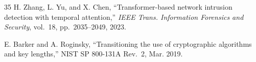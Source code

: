 \documentclass[conference]{IEEEtran}
\begin{document}
\begin{thebibliography}{35}
H. Zhang, L. Yu, and X. Chen, ``Transformer-based network intrusion detection with temporal attention,'' \emph{IEEE Trans. Information Forensics and Security}, vol.~18, pp.~2035--2049, 2023.

E. Barker and A. Roginsky, ``Transitioning the use of cryptographic algorithms and key lengths,'' NIST SP 800-131A Rev.~2, Mar. 2019.

\end{thebibliography}
\end{document}
